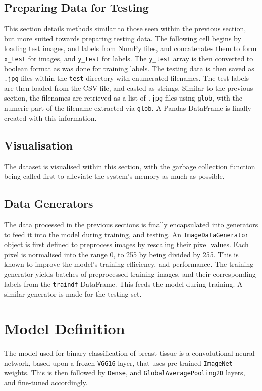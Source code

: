 \documentclass[../main]{subfiles}
\begin{document}
\subsection{Preparing Data for Testing}
This section details methods similar to those seen within the previous section,
but more suited towards preparing testing data. The following cell begins by
loading test images, and labels from NumPy files, and concatenates them to form
\texttt{x\_test} for images, and \texttt{y\_test} for labels. The
\texttt{y\_test} array is then converted to boolean format as was done for
training labels. The testing data is then saved as \texttt{.jpg} files within
the \texttt{test} directory with enumerated filenames. The test labels are then
loaded from the CSV file, and casted as strings. Similar to the previous
section, the filenames are retrieved as a list of \texttt{.jpg} files using
\texttt{glob}, with the numeric part of the filename extracted via
\texttt{glob}. A Pandas DataFrame is finally created with this information.

\subsection{Visualisation}
The dataset is visualised within this section, with the garbage
collection function being called first to alleviate the system's memory
as much as possible.
   
\subsection{Data Generators}
The data processed in the previous sections is finally encapsulated into
generators to feed it into the model during training, and testing. An
\texttt{ImageDataGenerator} object is first defined to preprocess images by
rescaling their pixel values. Each pixel is normalised into the range 0, to
255 by being divided by 255. This is known to improve the model's training
efficiency, and performance. The training generator yields batches of
preprocessed training images, and their corresponding labels from the
\texttt{traindf} DataFrame. This feeds the model during training. A similar
generator is made for the testing set.

\section{Model Definition}
The model used for binary classification of breast tissue is a
convolutional neural network, based upon a frozen \texttt{VGG16} layer,
that uses pre-trained \texttt{ImageNet} weights. This is then followed
by \texttt{Dense}, and \texttt{GlobalAveragePooling2D} layers, and
fine-tuned accordingly.
\end{document}
